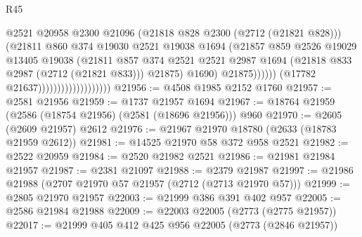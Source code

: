 \begin{lexlean}{R45}
\begin{coremodule}
                                                  @2521
                                                  @20958
                                                  @2300
                                                  @21096
                                                  (@21818 @828 @2300 (@2712 (@21821 @828)))
                                                  (@21811
                                                    @860
                                                    @374
                                                    @19030
                                                    @2521
                                                    @19038
                                                    @1694
                                                    (@21857
                                                      @859
                                                      @2526
                                                      @19029
                                                      @13405
                                                      @19038
                                                      (@21811
                                                        @857
                                                        @374
                                                        @2521
                                                        @2521
                                                        @2987
                                                        @1694
                                                        (@21818 @833 @2987 (@2712 (@21821 @833)))
                                                        @21875)
                                                      @1690)
                                                    @21875))))))
                                        (@17782 @21637)))))))))))))))))))
@21956 := @4508 @1985 @2152 @1760
@21957 := @2581 @21956
@21959 := @1737 @21957 @1694
@21967 := @18764 @21959 (@2586 (@18754 @21956) (@2581 (@18696 @21956))) @960
@21970 := @2605 (@2609 @21957) @2612
@21976 := @21967 @21970 @18780 (@2633 (@18783 @21959 @2612))
@21981 := @14525 @21970 @58 @372 @958 @2521
@21982 := @2522 @20959
@21984 := @2520 @21982 @2521
@21986 := @21981 @21984 @21957
@21987 := @2381 @21097
@21988 := @2379 @21987
@21997 := @21986 @21988 (@2707 @21970 @57 @21957 (@2712 (@2713 @21970 @57)))
@21999 := @2805 @21970 @21957
@22003 := @21999 @386 @391 @402 @957
@22005 := @2586 @21984 @21988
@22009 := @22003 @22005 (@2773 (@2775 @21957))
@22017 := @21999 @405 @412 @425 @956 @22005 (@2773 (@2846 @21957))

\end{coremodule}
\end{lexlean}
